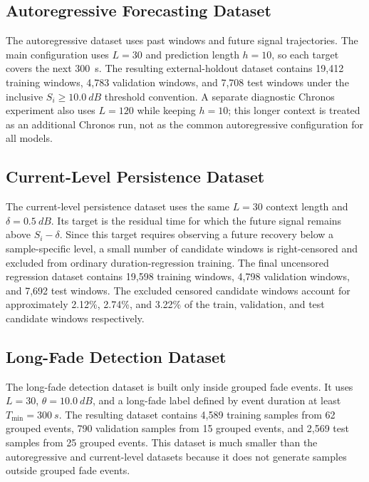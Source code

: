 \subsection{Autoregressive Forecasting Dataset}

The autoregressive dataset uses past windows and future signal trajectories.
The main configuration uses \(L=30\) and prediction length \(h=10\), so each
target covers the next \SI{300}{s}. The resulting external-holdout dataset
contains 19,412 training windows, 4,783 validation windows, and 7,708 test
windows under the inclusive \(S_i\ge\SI{10.0}{dB}\) threshold convention. A
separate diagnostic Chronos experiment also uses \(L=120\) while keeping
\(h=10\); this longer context is treated as an additional Chronos run, not as
the common autoregressive configuration for all models.

\subsection{Current-Level Persistence Dataset}

The current-level persistence dataset uses the same \(L=30\) context length and
\(\delta=\SI{0.5}{dB}\). Its target is the residual time for which the future
signal remains above \(S_i-\delta\). Since this target requires observing a
future recovery below a sample-specific level, a small number of candidate
windows is right-censored and excluded from ordinary duration-regression
training. The final uncensored regression dataset contains 19,598 training
windows, 4,798 validation windows, and 7,692 test windows. The excluded
censored candidate windows account for approximately 2.12\%, 2.74\%, and
3.22\% of the train, validation, and test candidate windows respectively.

\subsection{Long-Fade Detection Dataset}

The long-fade detection dataset is built only inside grouped fade events. It
uses \(L=30\), \(\theta=\SI{10.0}{dB}\), and a long-fade label defined by event
duration at least \(T_{\min}=\SI{300}{s}\). The resulting dataset contains 4,589
training samples from 62 grouped events, 790 validation samples from 15 grouped
events, and 2,569 test samples from 25 grouped events. This dataset is much
smaller than the autoregressive and current-level datasets because it does not
generate samples outside grouped fade events.


